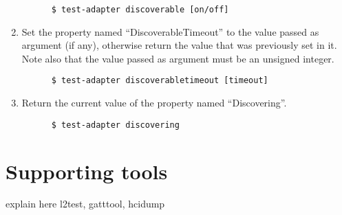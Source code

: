\documentclass[11pt]{article}
\begin{document}
\begin{enumerate}
\begin{verbatim}
      $ test-adapter discoverable [on/off]
    \end{verbatim}
  \item Set the property named ``DiscoverableTimeout'' to the value
        passed as argument (if any), otherwise return the value that
        was previously set in it. Note also that the value passed as
        argument must be an unsigned integer.
    \begin{verbatim}
      $ test-adapter discoverabletimeout [timeout]
    \end{verbatim}
  \item Return the current value of the property named ``Discovering''.
    \begin{verbatim}
      $ test-adapter discovering
    \end{verbatim}
\end{enumerate}

\section{Supporting tools}

explain here l2test, gatttool, hcidump
\end{document}
